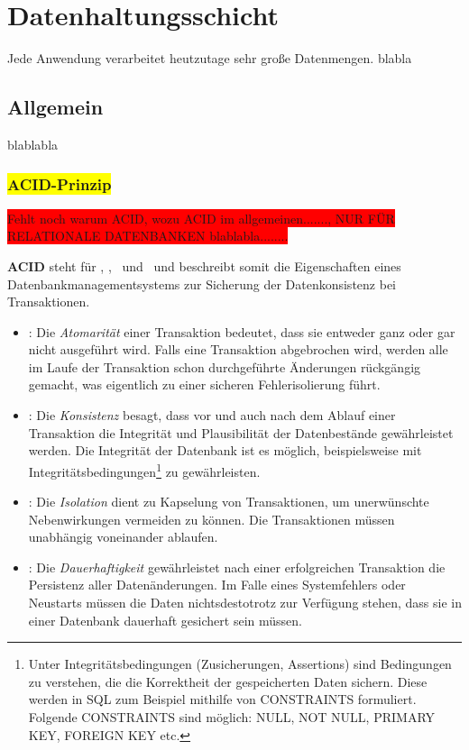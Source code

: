 \chapter{Datenhaltungsschicht}

Jede Anwendung verarbeitet heutzutage sehr große Datenmengen. blabla

\section{Allgemein}
blablabla

\subsection{\colorbox{yellow}{ACID-Prinzip}}\label{acid}
\colorbox{red}{Fehlt noch warum ACID, wozu ACID im allgemeinen......., NUR FÜR RELATIONALE DATENBANKEN blablabla........}

\textbf{ACID} steht für \Acid, \aCid, \acId\ und \aciD\ und beschreibt somit die Eigenschaften eines Datenbankmanagementsystems zur Sicherung der Datenkonsistenz bei Transaktionen.
\begin{itemize}

\item \Acid: Die \textit{Atomarität} einer Transaktion bedeutet, dass sie entweder ganz oder gar nicht ausgeführt wird. Falls eine Transaktion abgebrochen wird, werden alle im Laufe der Transaktion schon durchgeführte Änderungen rückgängig gemacht, was eigentlich zu einer sicheren Fehlerisolierung führt.
\item \aCid: Die \textit{Konsistenz} besagt, dass vor und auch nach dem Ablauf einer Transaktion die Integrität und Plausibilität der Datenbestände gewährleistet werden. Die Integrität der Datenbank ist es möglich, beispielsweise mit Integritätsbedingungen\footnote{Unter Integritätsbedingungen (Zusicherungen, Assertions) sind Bedingungen zu verstehen, die die Korrektheit der gespeicherten Daten sichern. Diese werden in SQL zum Beispiel mithilfe von CONSTRAINTS formuliert. Folgende CONSTRAINTS sind möglich: NULL, NOT NULL, PRIMARY KEY, FOREIGN KEY etc.} zu gewährleisten. 
\item \acId: Die \textit{Isolation} dient zu Kapselung von Transaktionen, um unerwünschte Nebenwirkungen vermeiden zu können. Die Transaktionen müssen unabhängig voneinander ablaufen.
\item \aciD: Die \textit{Dauerhaftigkeit} gewährleistet nach einer erfolgreichen Transaktion die Persistenz aller Datenänderungen. Im Falle eines Systemfehlers oder Neustarts müssen die Daten nichtsdestotrotz zur Verfügung stehen, dass sie in einer Datenbank dauerhaft gesichert sein müssen.
\end{itemize}

